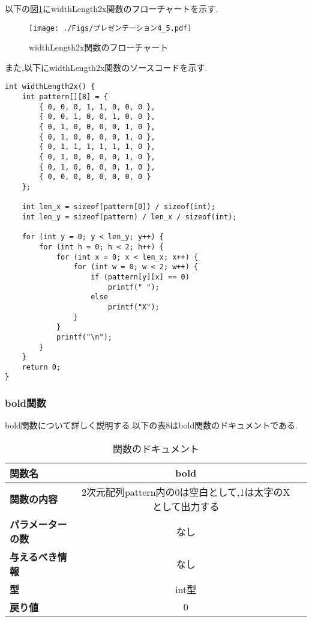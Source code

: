 \documentclass[uplatex,dvipdfmx]{jsarticle}
\begin{document}
以下の図\ref{fig:widthLength2x関数のフローチャート}にwidthLength2x関数のフローチャートを示す.
\begin{figure}[h]
    \centering
    \texttt{[image: ./Figs/プレゼンテーション4\_5.pdf]}
    \caption{widthLength2x関数のフローチャート}
    \label{fig:widthLength2x関数のフローチャート}
\end{figure}

また,以下にwidthLength2x関数のソースコードを示す.
\begin{lstlisting}[firstnumber = 1, caption=縦横２倍の大きさで表示する, label=code]
int widthLength2x() {
    int pattern[][8] = {
        { 0, 0, 0, 1, 1, 0, 0, 0 },
        { 0, 0, 1, 0, 0, 1, 0, 0 },
        { 0, 1, 0, 0, 0, 0, 1, 0 },
        { 0, 1, 0, 0, 0, 0, 1, 0 },
        { 0, 1, 1, 1, 1, 1, 1, 0 },
        { 0, 1, 0, 0, 0, 0, 1, 0 },
        { 0, 1, 0, 0, 0, 0, 1, 0 },
        { 0, 0, 0, 0, 0, 0, 0, 0 }
    };

    int len_x = sizeof(pattern[0]) / sizeof(int);
    int len_y = sizeof(pattern) / len_x / sizeof(int);

    for (int y = 0; y < len_y; y++) {
        for (int h = 0; h < 2; h++) { 
            for (int x = 0; x < len_x; x++) {
                for (int w = 0; w < 2; w++) { 
                    if (pattern[y][x] == 0) 
                        printf(" ");
                    else 
                        printf("X");
                }
            }
            printf("\n");
        }
    }
    return 0;
}
\end{lstlisting}

\subsubsection{bold関数}
bold関数について詳しく説明する.以下の表8はbold関数のドキュメントである.
\begin{table}[h]
    \centering
    \caption{関数のドキュメント}
    \begin{tabular}{@{}lcc@{}}
    \toprule
    \textbf{関数名}         & \textbf{bold}                                        \\ \midrule
    \textbf{関数の内容}                &  2次元配列pattern内の0は空白として,1は太字のXとして出力する  \\ 
    \textbf{パラメーターの数}               &     なし                                \\ 
    \textbf{与えるべき情報}             &     なし                        \\ 
    \textbf{型}                &     int型                    \\ 
    \textbf{戻り値}                & 0                              \\ \bottomrule
  \end{tabular}
\end{table}
\end{document}
